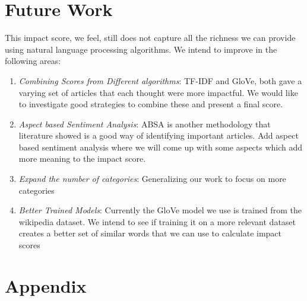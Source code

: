 \documentclass{article}
\begin{document}
\maketitle
\section {Future Work}
This impact score, we feel, still does not capture all the richness we can provide using natural language processing algorithms. We intend to improve in the following areas:
\begin {enumerate}
\item \textit {Combining Scores from Different algorithms}: TF-IDF and GloVe, both gave a varying set of articles that each thought were more impactful. We would like to investigate good strategies to combine these and present a final score.
\item \textit {Aspect based Sentiment Analysis}: ABSA is another methodology that literature showed is a good way of identifying important articles. Add aspect based sentiment analysis where we will come up with some aspects which add more meaning to the impact score.
\item \textit {Expand the number of categories}: Generalizing our work to focus on more categories
\item \textit {Better Trained Models}: Currently the GloVe model we use is trained from the wikipedia dataset. We intend to see if training it on a more relevant dataset creates a better set of similar words that we can use to calculate impact scores
\end {enumerate}


\maketitle
\section {Appendix}
\end{document}
